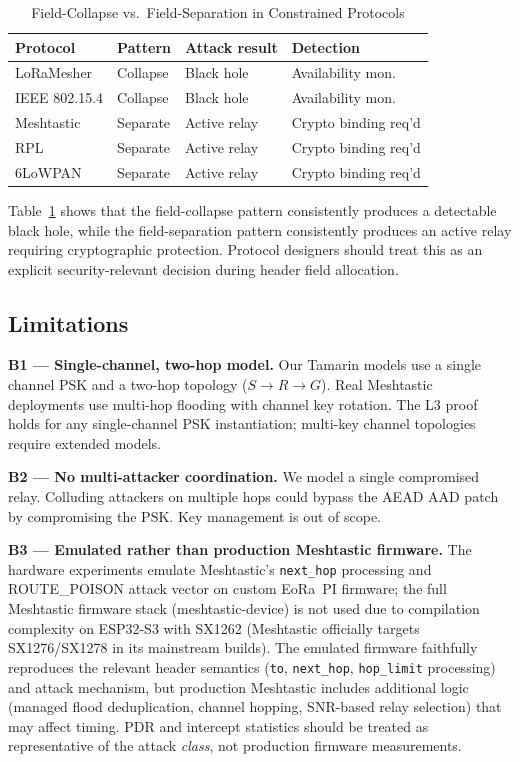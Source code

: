 \documentclass[journal]{IEEEtran}
\begin{document}
\begin{table}[h]
  \centering
  \caption{Field-Collapse vs.\ Field-Separation in Constrained Protocols}
  \label{tab:taxonomy-gen}
  \begin{tabular}{p{2.0cm}p{1.5cm}p{1.8cm}p{1.8cm}}
    \toprule
    Protocol & Pattern & Attack result & Detection \\
    \midrule
    LoRaMesher & Collapse & Black hole & Availability mon. \\
    IEEE 802.15.4 & Collapse & Black hole & Availability mon. \\
    Meshtastic & Separate & Active relay & Crypto binding req'd \\
    RPL & Separate & Active relay & Crypto binding req'd \\
    6LoWPAN & Separate & Active relay & Crypto binding req'd \\
    \bottomrule
  \end{tabular}
\end{table}

Table~\ref{tab:taxonomy-gen} shows that the field-collapse pattern
consistently produces a detectable black hole, while the
field-separation pattern consistently produces an active relay
requiring cryptographic protection. Protocol designers should
treat this as an explicit security-relevant decision during header
field allocation.

\subsection{Limitations}

\textbf{B1 --- Single-channel, two-hop model.}
Our Tamarin models use a single channel PSK and a two-hop topology ($S
\to R \to G$). Real Meshtastic deployments use multi-hop flooding with
channel key rotation. The L3 proof holds for any single-channel PSK
instantiation; multi-key channel topologies require extended models.

\textbf{B2 --- No multi-attacker coordination.}
We model a single compromised relay. Colluding attackers on multiple hops
could bypass the AEAD AAD patch by compromising the PSK. Key management
is out of scope.

\textbf{B3 --- Emulated rather than production Meshtastic firmware.}
The hardware experiments emulate Meshtastic's \texttt{next\_hop}
processing and ROUTE\_POISON attack vector on custom EoRa~PI firmware;
the full Meshtastic firmware stack (meshtastic-device) is not used
due to compilation complexity on ESP32-S3 with SX1262 (Meshtastic
officially targets SX1276/SX1278 in its mainstream builds). The
emulated firmware faithfully reproduces the relevant header semantics
(\texttt{to}, \texttt{next\_hop}, \texttt{hop\_limit} processing) and
attack mechanism, but production Meshtastic includes additional
logic (managed flood deduplication, channel hopping, SNR-based relay
selection) that may affect timing. PDR and intercept statistics should
be treated as representative of the attack \emph{class}, not production
firmware measurements.
\end{document}
